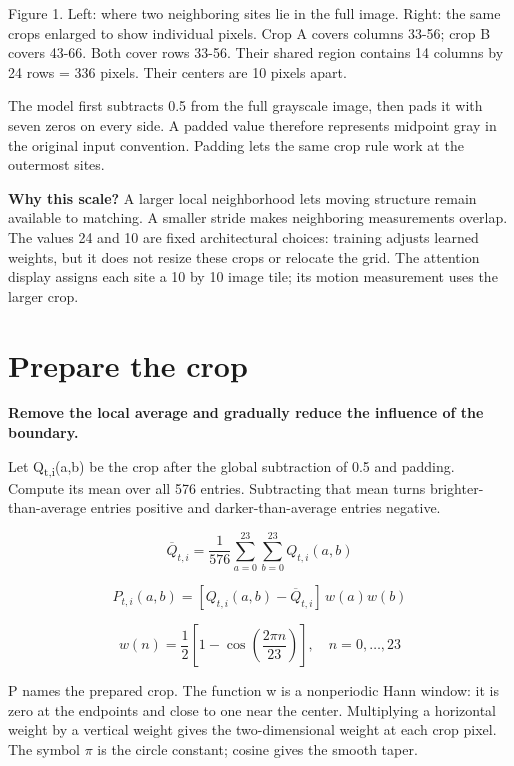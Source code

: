 \documentclass[11pt,letterpaper]{article}
\begin{document}
{
\small\color{muted} Figure 1. Left: where two neighboring sites lie in the full image. Right: the same crops enlarged to show individual pixels. Crop A covers columns 33-56; crop B covers 43-66. Both cover rows 33-56. Their shared region contains 14 columns by 24 rows = 336 pixels. Their centers are 10 pixels apart.\par}


The model first subtracts 0.5 from the full grayscale image, then pads it with seven zeros on every side. A padded value therefore represents midpoint gray in the original input convention. Padding lets the same crop rule work at the outermost sites.


\textbf{Why this scale?} A larger local neighborhood lets moving structure remain available to matching. A smaller stride makes neighboring measurements overlap. The values 24 and 10 are fixed architectural choices: training adjusts learned weights, but it does not resize these crops or relocate the grid. The attention display assigns each site a 10 by 10 image tile; its motion measurement uses the larger crop.


\clearpage

\section{Prepare the crop}\label{sec3}

\textbf{Remove the local average and gradually reduce the influence of the boundary.}


Let Q\textsubscript{t,i}(a,b) be the crop after the global subtraction of 0.5 and padding. Compute its mean over all 576 entries. Subtracting that mean turns brighter-than-average entries positive and darker-than-average entries negative.


\begin{equation}\overline Q_{t,i}=\frac{1}{576}\sum_{a=0}^{23}\sum_{b=0}^{23}Q_{t,i}(a,b)\end{equation}

\begin{equation}P_{t,i}(a,b)=[Q_{t,i}(a,b)-\overline Q_{t,i}]\,w(a)w(b)\end{equation}

\begin{equation}w(n)=\frac12\left[1-\cos\left(\frac{2\pi n}{23}\right)\right],\quad n=0,\ldots,23\end{equation}

P names the prepared crop. The function w is a nonperiodic Hann window: it is zero at the endpoints and close to one near the center. Multiplying a horizontal weight by a vertical weight gives the two-dimensional weight at each crop pixel. The symbol \(\pi\) is the circle constant; cosine gives the smooth taper.
\end{document}
